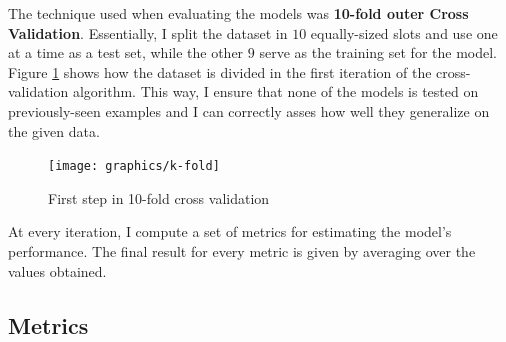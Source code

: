 		The technique used when evaluating the models was \textbf{10-fold outer Cross Validation}. Essentially, I split the dataset in $10$ equally-sized slots and use one at a time as a test set, while the other $9$ serve as the training set for the model. Figure \ref{Fig: impl/ml/methodology/kfold/first} shows how the dataset is divided in the first iteration of the cross-validation algorithm. This way, I ensure that none of the models is tested on previously-seen examples and I can correctly asses how well they generalize on the given data.
		\begin{figure}[H]
			\centering
			\texttt{[image: graphics/k-fold]}
			\caption{First step in 10-fold cross validation}
			\label{Fig: impl/ml/methodology/kfold/first}
		\end{figure}
		
		At every iteration, I compute a set of metrics for estimating the model's performance. The final result for every metric is given by averaging over the values obtained. 
	\subsection{Metrics} \label{Section: eval/ml/metrics}
	
